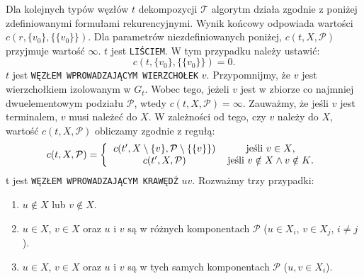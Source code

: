 \documentclass[12pt, oneside]{report}
\begin{document}
Dla kolejnych typów węzłów $t$ dekompozycji $\mathcal{T}$ algorytm działa zgodnie z poniżej zdefiniowanymi formułami rekurencyjnymi. Wynik końcowy odpowiada wartości $c(r, \{v_0\}, \{\{v_0\}\})$. Dla parametrów niezdefiniowanych poniżej, $c(t, X, \mathcal{P})$ przyjmuje wartość $\infty$.
\newline\newline
$t$ jest \texttt{LIŚCIEM}. W tym przypadku należy ustawić:
$$c(t, \{v_0\}, \{\{v_0\}\}) = 0.$$
\newline
$t$ jest \texttt{WĘZŁEM WPROWADZAJĄCYM WIERZCHOŁEK} $v$. Przypomnijmy, że $v$ jest wierzchołkiem izolowanym w $G_t$. Wobec tego, jeżeli $v$ jest w zbiorze co najmniej dwuelementowym podziału $\mathcal{P}$, wtedy $c(t, X, \mathcal{P}) = \infty$. Zauważmy, że jeśli $v$ jest terminalem, $v$ musi należeć do $X$. W zależności od tego, czy $v$ należy do $X$, wartość $c(t, X , \mathcal{P})$ obliczamy zgodnie z regułą:
\[
c(t, X, \mathcal{P}) =  
\left \{
  \begin{tabular}{ccc}
  $c(t', X \setminus \{v\}, \mathcal{P} \setminus \{\{v\}\})$ & jeśli $v \in X$,\\
  $c(t', X, \mathcal{P})$ & jeśli $v \notin X \wedge v \notin K$.
  \end{tabular}
\right. 
\]
\newline
t jest \texttt{WĘZŁEM WPROWADZAJĄCYM KRAWĘDŹ} $uv$. Rozważmy trzy przypadki:

\begin{enumerate}
\item \label{notinx} $u \notin X$ lub $v \notin X$.
\item \label{notinthesamecomponent} $u \in X$, $v \in X$ oraz $u$ i $v$ są w różnych komponentach $\mathcal{P}$ ($u \in X_i$, $v \in X_j$, $i \neq j$).
\item \label{edgepossible} $u \in X$, $v \in X$ oraz $u$ i $v$ są w tych samych komponentach $\mathcal{P}$ ($u,v \in X_i$).
\end{enumerate} 
\end{document}
